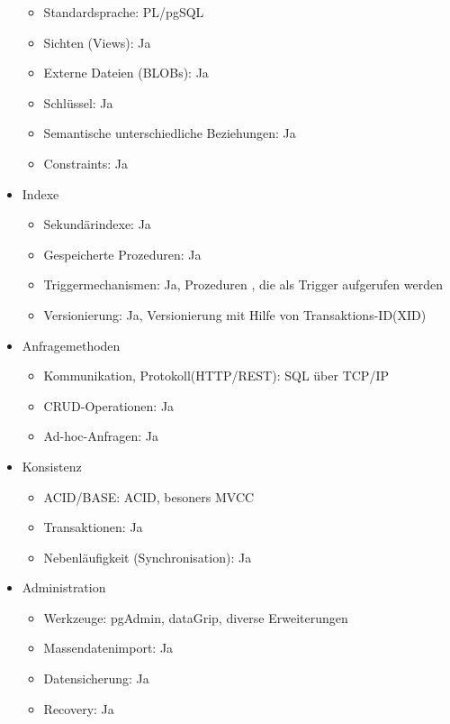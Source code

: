 \begin{itemize}
        \begin{itemize}
            \item Standardsprache: PL/pgSQL %
            \item Sichten (Views): Ja
            \item Externe Dateien (BLOBs): Ja
            \item Schlüssel: Ja
            \item Semantische unterschiedliche Beziehungen: Ja
            \item Constraints: Ja
        \end{itemize}
        \item Indexe
        \begin{itemize}
            \item Sekundärindexe: Ja
            \item Gespeicherte Prozeduren: Ja
            \item Triggermechanismen: Ja, Prozeduren , die als Trigger aufgerufen werden %
            \item Versionierung: Ja, Versionierung mit Hilfe von Transaktions-ID(XID) %
        \end{itemize}
        \item Anfragemethoden
        \begin{itemize}
            \item Kommunikation, Protokoll(HTTP/REST): SQL über TCP/IP
            \item CRUD-Operationen: Ja
            \item Ad-hoc-Anfragen: Ja
        \end{itemize}
        \item Konsistenz
        \begin{itemize}
            \item ACID/BASE: ACID, besoners MVCC
            \item Transaktionen: Ja
            \item Nebenläufigkeit (Synchronisation): Ja
        \end{itemize}
        \item Administration
        \begin{itemize}
            \item Werkzeuge: pgAdmin, dataGrip, diverse Erweiterungen
            \item Massendatenimport: Ja
            \item Datensicherung: Ja
            \item Recovery: Ja
        \end{itemize}
    \end{itemize}
